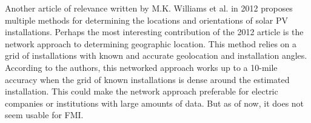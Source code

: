 Another article of relevance written by M.K. Williams et al. in 2012\cite{older_solar_solver_article} proposes multiple methods for determining the locations and orientations of solar PV installations. Perhaps the most interesting contribution of the 2012 article is the network approach to determining geographic location. This method relies on a grid of installations with known and accurate geolocation and installation angles. According to the authors, this networked approach works up to a 10-mile accuracy when the grid of known installations is dense around the estimated installation. This could make the network approach preferable for electric companies or institutions with large amounts of data. But as of now, it does not seem usable for FMI.
